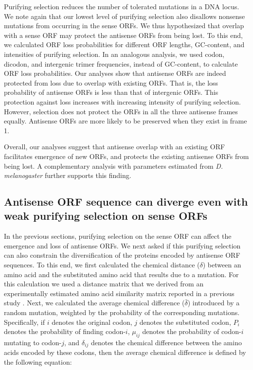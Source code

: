 \documentclass[12pt,a4paper]{article}
\begin{document}
Purifying selection reduces the number of tolerated mutations in a DNA locus. We note again that our lowest level of purifying selection also disallows nonsense mutations from occurring in the sense ORFs. We thus hypothesized that overlap with a sense ORF may protect the antisense ORFs from being lost. To this end, we calculated ORF loss probabilities for different ORF lengths, GC-content, and intensities of purifying selection. In an analogous analysis, we used codon, dicodon, and intergenic trimer frequencies, instead of GC-content, to calculate ORF loss probabilities. Our analyses show that antisense ORFs are indeed protected from loss due to overlap with existing ORFs. That is, the loss probability of antisense ORFs is less than that of intergenic ORFs. This protection against loss increases with increasing intensity of purifying selection. However, selection does not protect the ORFs in all the three antisense frames equally. Antisense ORFs are more likely to be preserved when they exist in frame 1. 


Overall, our analyses suggest that antisense overlap with an existing ORF facilitates emergence of new ORFs, and protects the existing antisense ORFs from being lost. A complementary analysis with parameters estimated from \textit{D. melanogaster} further supports this finding.

\subsection*{Antisense ORF sequence can diverge even with weak purifying selection on sense ORFs}

In the previous sections, purifying selection on the sense ORF can affect the emergence and loss of antisense ORFs. We next asked if this purifying selection can also constrain the diversification of the proteins encoded by antisense ORF sequences. To this end, we first calculated the chemical distance ($\delta$) between an amino acid and the substituted amino acid that results due to a mutation. For this calculation we used a distance matrix that we derived from an experimentally estimated amino acid similarity matrix reported in a previous study \citep{PMBEC}. Next, we calculated the average chemical difference ($\bar{\delta}$) introduced by a random mutation, weighted by the probability of the corresponding mutations. Specifically, if $i$ denotes the original codon, $j$ denotes the substituted codon, $P_i$ denotes the probability of finding codon-$i$, $\mu_{ij}$ denotes the probability of codon-$i$ mutating to codon-$j$, and $\delta_{ij}$ denotes the chemical difference between the amino acids encoded by these codons, then the average chemical difference is defined by the following equation:
\end{document}
